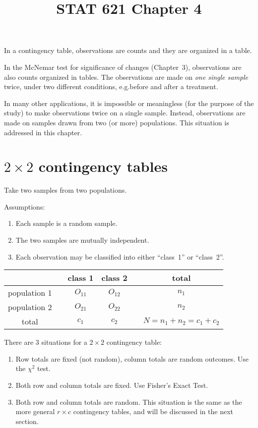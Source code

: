 \documentclass[12pt]{article}
\begin{document}
\title{STAT 621 Chapter 4}
\maketitle

In a contingency table,
observations are counts and they are organized in a table.

In the McNemar test for significance of changes
(Chapter~3), observations are also counts organized in tables.
The observations are made on \emph{one single sample} twice,
under two different conditions, e.g.\@ before and after a treatment.

In many other applications, it is impossible or meaningless (for the
purpose of the study) to make observations twice on a single sample.
Instead, observations are made on samples drawn from two (or more)
populations. This situation is addressed in this chapter.

\section{$2\times 2$ contingency tables}

Take two samples from two populations.

Assumptions:
\begin{enumerate}
\item Each sample is a random sample.
\item The two samples are mutually independent.
\item Each observation may be classified into either
    ``class~1'' or ``class~2''.
\end{enumerate}


\begin{center}
\begin{tabular}{cc|cc|cc}
    && class 1 & class 2&& total\\ \hline
population 1 && $O_{11}$ & $O_{12}$ && $n_1$\\
population 2 && $O_{21}$ & $O_{22}$ && $n_2$\\ \hline
total       && $c_1$ & $c_2$        && $N = n_1 + n_2 = c_1 + c_2$
\end{tabular}
\end{center}

There are 3 situations for a $2\times 2$ contingency table:
\begin{enumerate}
\item Row totals are fixed (not random), column totals are random
outcomes. Use the $\chi^2$ test.
\item Both row and column totals are fixed. Use Fisher's Exact Test.
\item Both row and column totals are random. This situation is the same
    as the more general $r\times c$ contingency tables, and will be
    discussed in the next section.
\end{enumerate}
\end{document}
